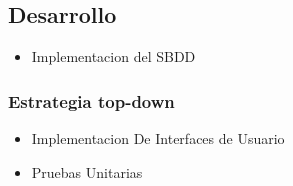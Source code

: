 \documentclass[spanish, 12pt]{article}
\providecommand{\tightlist}{\setlength{\itemsep}{0pt}
\setlength{\parskip}{0pt}}
\begin{document}
	\subsection{Desarrollo}
	\label{desarrollo}

	\begin{itemize}
		\tightlist

		\item Implementacion del SBDD
	\end{itemize}

	\subsubsection{Estrategia top-down}
	\label{estrategia-top-down}

	\begin{itemize}
		\tightlist

		\item Implementacion De Interfaces de Usuario

		\item Pruebas Unitarias
	\end{itemize}
\end{document}
